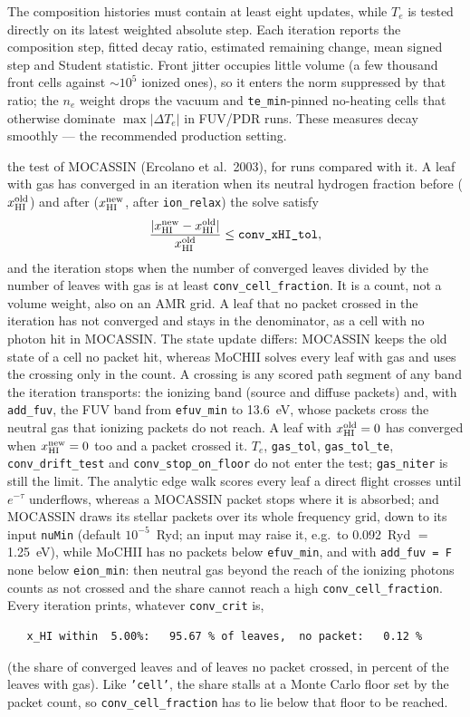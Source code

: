 \documentclass[english,a4paper]{my_memo}
\newcommand{\code}[1]{\texttt{#1}}
\begin{document}
\begin{description}
  The composition histories must contain at least eight updates, while
  $T_e$ is tested directly on its latest weighted absolute step.
  Each iteration reports the composition step, fitted decay ratio,
  estimated remaining change, mean signed step and Student statistic.
  Front jitter occupies little volume (a few thousand front cells against
  $\sim$$10^5$ ionized ones), so it enters the norm suppressed by that ratio;
  the $n_e$ weight drops the vacuum and \code{te\_min}-pinned no-heating cells
  that otherwise dominate $\max|\Delta T_e|$ in FUV/PDR runs.  These measures
  decay smoothly --- the recommended production setting.
\item[\code{'cell\_fraction'}] the test of MOCASSIN (Ercolano et al.\ 2003),
  for runs compared with it.  A leaf with gas has converged in an iteration
  when its neutral hydrogen fraction before ($x^{\rm old}_{\rm HI}$) and
  after ($x^{\rm new}_{\rm HI}$, after \code{ion\_relax}) the solve satisfy
  \[
    \frac{|x^{\rm new}_{\rm HI}-x^{\rm old}_{\rm HI}|}{x^{\rm old}_{\rm HI}}
    \le \code{conv\_xHI\_tol},
  \]
  and the iteration stops when the number of converged leaves divided by the
  number of leaves with gas is at least \code{conv\_cell\_fraction}.  It is a
  count, not a volume weight, also on an AMR grid.  A leaf that no packet
  crossed in the iteration has not converged and stays in the denominator,
  as a cell with no photon hit in MOCASSIN.  The state update differs:
  MOCASSIN keeps the old state of a cell no packet hit, whereas MoCHII
  solves every leaf with gas and uses the crossing only in the count.  A crossing is any scored path
  segment of any band the iteration transports: the ionizing band (source
  and diffuse packets) and, with \code{add\_fuv}, the FUV band from
  \code{efuv\_min} to 13.6~eV, whose packets cross the neutral gas that
  ionizing packets do not reach.  A leaf with $x^{\rm old}_{\rm HI}=0$ has converged when
  $x^{\rm new}_{\rm HI}=0$ too and a packet crossed it.  $T_e$,
  \code{gas\_tol}, \code{gas\_tol\_te}, \code{conv\_drift\_test} and \code{conv\_stop\_on\_floor} do not
  enter the test; \code{gas\_niter} is still the limit.  The analytic edge
  walk scores every leaf a direct flight crosses until $e^{-\tau}$
  underflows, whereas a MOCASSIN packet stops where it is absorbed; and
  MOCASSIN draws its stellar packets over its whole frequency grid, down to
  its input \code{nuMin} (default $10^{-5}$~Ryd; an input may raise it,
  e.g.\ to 0.092~Ryd $=$ 1.25~eV), while MoCHII has no packets below
  \code{efuv\_min}, and with \code{add\_fuv = F} none below
  \code{eion\_min}: then neutral gas beyond the reach of the ionizing
  photons counts as not crossed and the share cannot reach a high
  \code{conv\_cell\_fraction}.  Every iteration prints, whatever
  \code{conv\_crit} is,
\begin{verbatim}
   x_HI within  5.00%:   95.67 % of leaves,  no packet:   0.12 %
\end{verbatim}
  (the share of converged leaves and of leaves no packet crossed, in
  percent of the leaves with gas).  Like \code{'cell'}, the
  share stalls at a Monte Carlo floor set by the packet count, so
  \code{conv\_cell\_fraction} has to lie below that floor to be reached.


\end{description}
\end{document}
